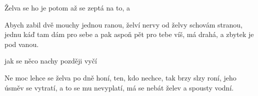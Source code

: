 \begin{TEXT}{Želva}
\SLOKA {}  se   ho\NL
     je   \NL
   potom  až se zeptá na to, \NL
     a   

\SLOKA Abych zabil dvě mouchy jednou ranou,\NL
želví nervy od želvy schovám stranou,\NL
jednu káď tam dám pro sebe a pak aspoň pět pro tebe\NL
víš, má drahá, a zbytek je pod vanou.


\REFREN {}    jak se   \NL
    něco nachy  později vyčí

\SLOKA Ne moc lehce se želva po dně honí,\NL
ten, kdo nechce, tak brzy slzy roní,\NL
jeho úsměv se vytratí, a to se mu nevyplatí,\NL
má se nebát želev a spousty vodní.

\REFRENHRAJ
\end{TEXT}
